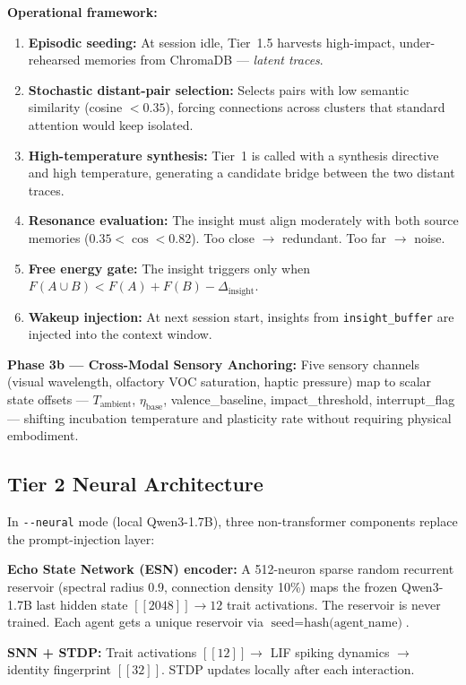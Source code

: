\documentclass[11pt,a4paper]{article}
\begin{document}
\textbf{Operational framework:}
\begin{enumerate}[leftmargin=*]
  \item \textbf{Episodic seeding:} At session idle, Tier~1.5 harvests high-impact,
  under-rehearsed memories from ChromaDB — \textit{latent traces}.
  \item \textbf{Stochastic distant-pair selection:} Selects pairs with low semantic
  similarity (cosine $< 0.35$), forcing connections across clusters that standard
  attention would keep isolated.
  \item \textbf{High-temperature synthesis:} Tier~1 is called with a synthesis directive
  and high temperature, generating a candidate bridge between the two distant traces.
  \item \textbf{Resonance evaluation:} The insight must align moderately with both source
  memories ($0.35 < \cos < 0.82$). Too close $\to$ redundant. Too far $\to$ noise.
  \item \textbf{Free energy gate:} The insight triggers only when
  $F(A\cup B) < F(A) + F(B) - \Delta_{\text{insight}}$.
  \item \textbf{Wakeup injection:} At next session start, insights from
  \texttt{insight\_buffer} are injected into the context window.
\end{enumerate}

\textbf{Phase 3b — Cross-Modal Sensory Anchoring:} Five sensory channels (visual
wavelength, olfactory VOC saturation, haptic pressure) map to scalar state offsets —
$T_{\text{ambient}}$, $\eta_{\text{base}}$, valence\_baseline, impact\_threshold,
interrupt\_flag — shifting incubation temperature and plasticity rate without requiring
physical embodiment.

\subsection{Tier 2 Neural Architecture}
\label{sec:neural}

In \texttt{-{}-neural} mode (local Qwen3-1.7B), three non-transformer components replace
the prompt-injection layer:

\textbf{Echo State Network (ESN) encoder:} A 512-neuron sparse random recurrent reservoir
(spectral radius 0.9, connection density 10\%) maps the frozen Qwen3-1.7B last hidden
state $[\![2048]\!] \to 12$ trait activations. The reservoir is never trained. Each agent
gets a unique reservoir via $\text{seed} = \text{hash(agent\_name)}$.

\textbf{SNN + STDP:} Trait activations $[\![12]\!] \to$ LIF spiking dynamics $\to$
identity fingerprint $[\![32]\!]$. STDP updates locally after each interaction.
\end{document}
